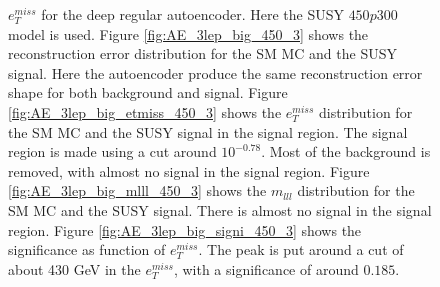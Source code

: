 \begin{figure}[H]
{    $e_T^{miss}$ for the deep regular autoencoder. Here the SUSY $450p300$ model is used. 
    Figure \ref{fig:AE_3lep_big_450_3} shows the reconstruction error 
    distribution for the SM MC and the SUSY signal. Here the autoencoder produce the same reconstruction error shape for both background and 
    signal. Figure \ref{fig:AE_3lep_big_etmiss_450_3} shows the $e_T^{miss}$ distribution for the SM MC and the SUSY signal in the signal region. 
    The signal region is made using a cut around $10^{-0.78}$. Most of the background is removed, with almost no signal in the signal region.
    Figure \ref{fig:AE_3lep_big_mlll_450_3} shows the $m_{lll}$ distribution for the SM MC and the SUSY signal. 
    There is almost no signal in the signal region. Figure \ref{fig:AE_3lep_big_signi_450_3} shows the significance as function of
    $e_T^{miss}$. The peak is put around a cut of about 430 GeV in the $e_T^{miss}$, with a significance of around $0.185$.}
    \label{fig:AE_3lep_big_rec_sig_signi_450_3}
\end{figure}

